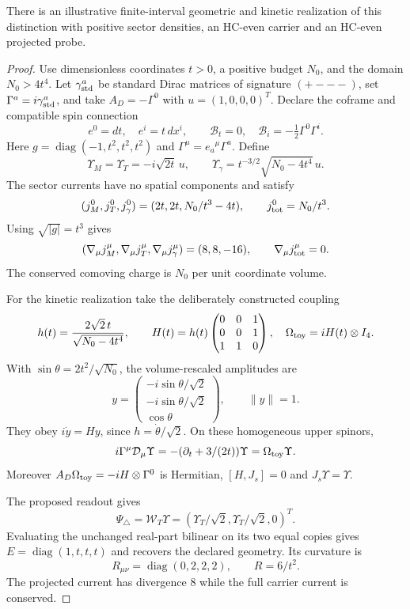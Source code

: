 \begin{proposition}
\label{prop:local-carrier-projected-coframe}
There is an illustrative finite-interval geometric and kinetic
realization of this distinction with positive sector densities,
an HC-even carrier and an HC-even projected probe.
\end{proposition}
\begin{proof}
Use dimensionless coordinates $t>0$, a positive budget $N_0$, and
the domain $N_0>4t^4$. Let $\gamma_{\rm std}^a$ be standard Dirac
matrices of signature $(+---)$, set $\Gamma^a=i\gamma_{\rm std}^a$,
and take $A_D=-\Gamma^0$ with $u=(1,0,0,0)^T$.
Declare the coframe and compatible spin connection
\[
  e^0=dt,\quad e^i=t\,dx^i,\qquad
  \mathcal B_t=0,\quad
  \mathcal B_i=-\tfrac12\Gamma^0\Gamma^i.
\]
Here $g=\operatorname{diag}(-1,t^2,t^2,t^2)$ and
$\Gamma^\mu=e_a{}^\mu\Gamma^a$. Define
\[
  \Upsilon_M=\Upsilon_T=-i\sqrt{2t}\,u,\qquad
  \Upsilon_\gamma=t^{-3/2}\sqrt{N_0-4t^4}\,u.
\]
The sector currents have no spatial components and satisfy
\[
  (j_M^0,j_T^0,j_\gamma^0)
  =(2t,2t,N_0/t^3-4t),\qquad
  j_{\rm tot}^0=N_0/t^3.
\]
Using $\sqrt{|g|}=t^3$ gives
\[
  (\nabla_\mu j_M^\mu,\nabla_\mu j_T^\mu,
    \nabla_\mu j_\gamma^\mu)=(8,8,-16),
  \qquad \nabla_\mu j_{\rm tot}^\mu=0.
\]
The conserved comoving charge is $N_0$ per unit coordinate volume.

For the kinetic realization take the deliberately constructed coupling
\[
  h(t)=\frac{2\sqrt2\,t}{\sqrt{N_0-4t^4}},\qquad
  H(t)=h(t)\begin{pmatrix}0&0&1\\0&0&1\\1&1&0\end{pmatrix},
  \quad \Omega_{\rm toy}=iH(t)\otimes I_4.
\]
With $\sin\theta=2t^2/\sqrt{N_0}$, the volume-rescaled amplitudes
are
\[
  y=\begin{pmatrix}
    -i\sin\theta/\sqrt2\\-i\sin\theta/\sqrt2\\\cos\theta
  \end{pmatrix},\qquad \|y\|=1.
\]
They obey $i\dot y=Hy$, since
$h=\dot\theta/\sqrt2$. On these homogeneous upper spinors,
\[
  i\Gamma^\mu\mathcal D_\mu\Upsilon
  =-(\partial_t+3/(2t))\Upsilon
  =\Omega_{\rm toy}\Upsilon.
\]
Moreover $A_D\Omega_{\rm toy}=-iH\otimes\Gamma^0$ is Hermitian,
$[H,J_s]=0$ and $J_s\Upsilon=\Upsilon$.

The proposed readout gives
\[
  \Psi_\triangle=\mathcal W_T\Upsilon
  =(\Upsilon_T/\sqrt2,\Upsilon_T/\sqrt2,0)^T.
\]
Evaluating the unchanged real-part bilinear on its two equal copies
gives $E=\operatorname{diag}(1,t,t,t)$ and recovers the declared
geometry. Its curvature is
\[
  R_{\mu\nu}=\operatorname{diag}(0,2,2,2),\qquad R=6/t^2.
\]
The projected current has divergence $8$ while the full
carrier current is conserved.
\end{proof}


